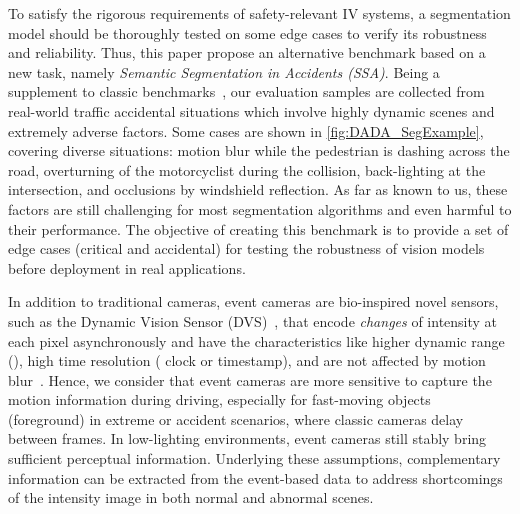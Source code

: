 \documentclass[letterpaper, 10 pt, conference]{ieeeconf}
\begin{document}
To satisfy the rigorous requirements of safety-relevant IV systems, a segmentation model should be thoroughly tested on some edge cases to verify its robustness and reliability. Thus, this paper propose an alternative benchmark based on a new task, namely \textit{Semantic Segmentation in Accidents (SSA)}. Being a supplement to classic benchmarks~\cite{cordts2016cityscapes, zendel2018wilddash}, our evaluation samples are collected from real-world traffic accidental situations which involve highly dynamic scenes and extremely adverse factors. Some cases are shown in \cref{fig:DADA_SegExample}, covering diverse situations: motion blur while the pedestrian is dashing across the road, overturning of the motorcyclist during the collision, back-lighting at the intersection, and occlusions by windshield reflection. As far as known to us, these factors are still challenging for most segmentation algorithms and even harmful to their performance. The objective of creating this benchmark is to provide a set of edge cases (critical and accidental) for testing the robustness of vision models before deployment in real applications.

In addition to traditional cameras, event cameras are bio-inspired novel sensors, such as the Dynamic Vision Sensor (DVS)~\cite{patrick2008DVS_sensor}, that encode \textit{changes} of intensity at each pixel asynchronously and have the characteristics like higher dynamic range (), high time resolution ( clock or  timestamp), and are not affected by motion blur~\cite{gallego2019event_survey}. Hence, we consider that event cameras are more sensitive to capture the motion information during driving, especially for fast-moving objects (foreground) in extreme or accident scenarios, where classic cameras delay between frames. In low-lighting environments, event cameras still stably bring sufficient perceptual information. Underlying these assumptions, complementary information can be extracted from the event-based data to address shortcomings of the intensity image in both normal and abnormal scenes.
\end{document}

